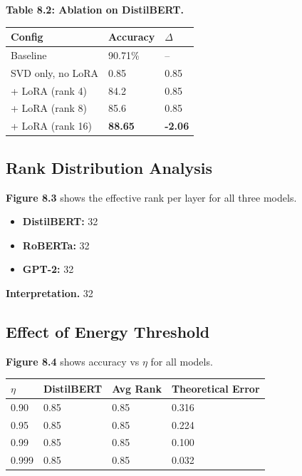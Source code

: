 \textbf{Table 8.2: Ablation on DistilBERT.}

\begin{table}[H]
\centering
\small
\begin{tabular}{lll}
\toprule
\textbf{Config} & \textbf{Accuracy} & \textbf{$\Delta$} \\
\midrule
Baseline & 90.71\% & -- \\
SVD only, no LoRA & 0.85 & 0.85 \\
+ LoRA (rank 4) & 84.2 & 0.85 \\
+ LoRA (rank 8) & 85.6 & 0.85 \\
+ LoRA (rank 16) & \textbf{88.65} & \textbf{-2.06} \\
\bottomrule
\end{tabular}
\end{table}

\subsection{Rank Distribution Analysis}

\textbf{Figure 8.3} shows the effective rank per layer for all three models.

\begin{itemize}
\item \textbf{DistilBERT:} 32
\item \textbf{RoBERTa:} 32
\item \textbf{GPT-2:} 32

\end{itemize}
\textbf{Interpretation.} 32

\subsection{Effect of Energy Threshold}

\textbf{Figure 8.4} shows accuracy vs $\eta$ for all models.

\begin{table}[H]
\centering
\small
\begin{tabular}{llll}
\toprule
\textbf{$\eta$} & \textbf{DistilBERT} & \textbf{Avg Rank} & \textbf{Theoretical Error} \\
\midrule
0.90 & 0.85 & 0.85 & 0.316 \\
0.95 & 0.85 & 0.85 & 0.224 \\
0.99 & 0.85 & 0.85 & 0.100 \\
0.999 & 0.85 & 0.85 & 0.032 \\
\bottomrule
\end{tabular}
\end{table}

